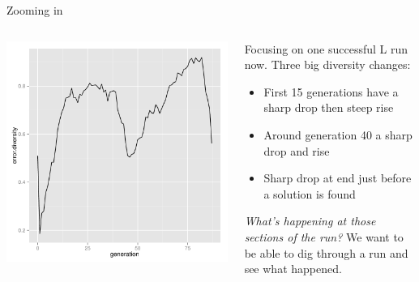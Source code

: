 \documentclass{beamer}
\newcommand{\linespace}{\vskip 0.25cm}
\begin{document}
\begin{frame}{Zooming in}
	
	\begin{columns}
		\begin{column}{0.55 \linewidth}
			\centering
			\includegraphics[width = \linewidth]{Figures/run6_lexicase_rswn_diversity.pdf}
		\end{column}
		
		\begin{column}{0.4 \linewidth}
			\begin{overprint}
				Focusing on one successful L run now.
				\linespace
				Three big diversity changes:
				\begin{itemize}
					\item First 15 generations have a sharp drop then steep rise
					\item Around generation 40 a sharp drop and rise
					\item Sharp drop at end just before a solution is found
				\end{itemize}
				
				\emph{What's happening at those sections of the run?}
				\linespace
				We want to be able to dig through a run and see what happened.
			\end{overprint}
		\end{column}
	\end{columns}
\end{frame}
\end{document}
